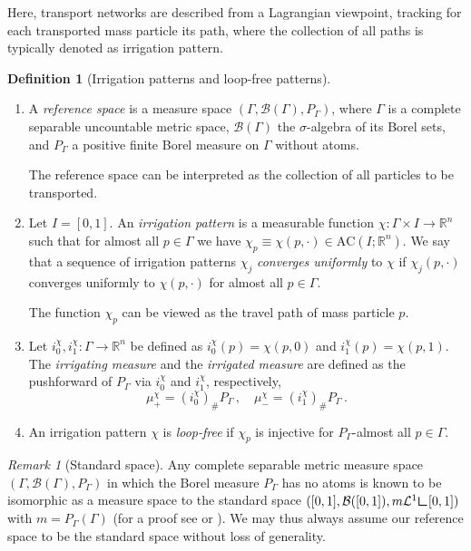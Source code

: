 \documentclass[10pt,a4paper,oneside,final]{article}
\newcommand{\R}{{\mathbb{R}}}
\newcommand{\lebesgue}{\mathcal{L}}
\newcommand{\pushforward}[2]{{{#1}_{\#}#2}}
\newcommand{\restr}{{\mbox{\LARGE$\llcorner$}}}
\newcommand{\AC}{\mathrm{AC}}
\newcommand{\reSpace}{\Gamma}
\newcommand{\reMeasure}{P_{\reSpace}}
\newcommand{\Bcal}{\mathcal{B}}
\numberwithin{equation}{section}
\theoremstyle{plain}
\theoremstyle{definition}
\newtheorem{definition}[theorem]{Definition}
\theoremstyle{remark}
\newtheorem{remark}[theorem]{Remark}
\begin{document}
Here, transport networks are described from a Lagrangian viewpoint, tracking for each transported mass particle its path, where the collection of all paths is typically denoted as irrigation pattern.

\begin{definition}[Irrigation patterns and loop-free patterns]\label{def:reference_space}
\begin{enumerate}
\item A \emph{reference space} is a measure space $(\reSpace,\Bcal(\reSpace),\reMeasure)$,
where $\reSpace$ is a complete separable uncountable metric space, $\Bcal(\reSpace)$ the $\sigma$-algebra of its Borel sets, and $\reMeasure$ a positive finite Borel measure on $\reSpace$ without atoms.

The reference space can be interpreted as the collection of all particles to be transported.
\item Let $I = [0,1]$. An \emph{irrigation pattern} is a measurable function $\chi : \reSpace \times I \to \R^n$ such that for almost all $p\in\reSpace$ we have $\chi_p\equiv\chi(p,\cdot) \in \AC(I;\R^n)$.
We say that a sequence of irrigation patterns $\chi_j$ \emph{converges uniformly} to $\chi$ if $\chi_j(p,\cdot)$ converges uniformly to $\chi(p,\cdot)$ for almost all $p\in\reSpace$.

The function $\chi_p$ can be viewed as the travel path of mass particle $p$.
\item Let $i_0^\chi,i_1^\chi:\reSpace \to \R^n$ be defined as $i_0^\chi(p) = \chi(p,0)$ and $i_1^\chi(p) = \chi(p,1)$.
The \emph{irrigating measure} and the \emph{irrigated measure} are defined as the pushforward of $\reMeasure$ via $i_0^\chi$ and $i_1^\chi$, respectively,
\begin{displaymath}
 \mu_+^\chi = \pushforward{(i_0^\chi)}{\reMeasure}\,, \quad \mu_-^\chi = \pushforward{(i_1^\chi)}{\reMeasure}\,.
\end{displaymath}
\item An irrigation pattern $\chi$ is \emph{loop-free} if $\chi_p$ is injective for $\reMeasure$-almost all $p\in\reSpace$.
\end{enumerate}
\end{definition}

\begin{remark}[Standard space]%
Any complete separable metric measure space $(\reSpace,\Bcal(\reSpace),\reMeasure)$ in which the Borel measure $\reMeasure$ has no atoms
is known to be isomorphic as a measure space to the standard space $([0,1],\Bcal([0,1]),m\lebesgue^1 \restr [0,1])$ with $m=\reMeasure(\reSpace)$
(for a proof see \cite[Prop.\,12 or Thm.\,16 in Sec.\,5 of Chap.\,15]{Royden-Real-Analysis} or \cite[Chap.\,1]{Villani-Transport-Old-New}).
We may thus always assume our reference space to be the standard space without loss of generality.
\end{remark}
\end{document}
